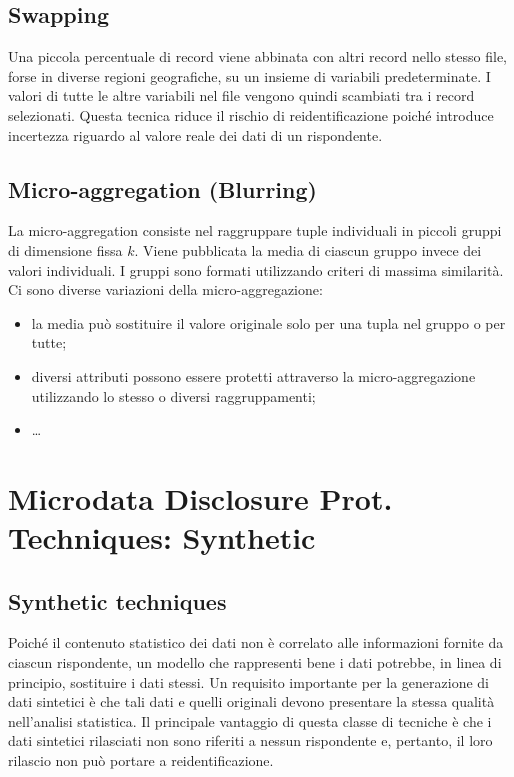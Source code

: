 \documentclass{report}
\begin{document}
\subsection{Swapping}
Una piccola percentuale di record viene abbinata con altri record nello stesso file, forse in diverse regioni geografiche, su un insieme di variabili predeterminate. 
I valori di tutte le altre variabili nel file vengono quindi scambiati tra i record selezionati. Questa tecnica riduce il rischio di reidentificazione poiché introduce incertezza riguardo al valore reale dei dati di un rispondente.

\subsection{Micro-aggregation (Blurring)}
La micro-aggregation consiste nel raggruppare tuple individuali in piccoli gruppi di dimensione fissa \( k \). Viene pubblicata la media di ciascun gruppo invece dei valori individuali. I gruppi sono formati utilizzando criteri di massima similarità. Ci sono diverse variazioni della micro-aggregazione:
\begin{itemize}
    \item la media può sostituire il valore originale solo per una tupla nel gruppo o per tutte;
    \item diversi attributi possono essere protetti attraverso la micro-aggregazione utilizzando lo stesso o diversi raggruppamenti;
    \item \ldots
\end{itemize}


\section{Microdata Disclosure Prot. Techniques: Synthetic}

\subsection{Synthetic techniques}
Poiché il contenuto statistico dei dati non è correlato alle informazioni fornite da ciascun rispondente, un modello che rappresenti bene i dati potrebbe, in linea di principio, sostituire i dati stessi. 
Un requisito importante per la generazione di dati sintetici è che tali dati e quelli originali devono presentare la stessa qualità nell'analisi statistica. Il principale vantaggio di questa classe di tecniche è che i dati sintetici rilasciati non sono riferiti a nessun rispondente e, pertanto, il loro rilascio non può portare a reidentificazione.
\end{document}
